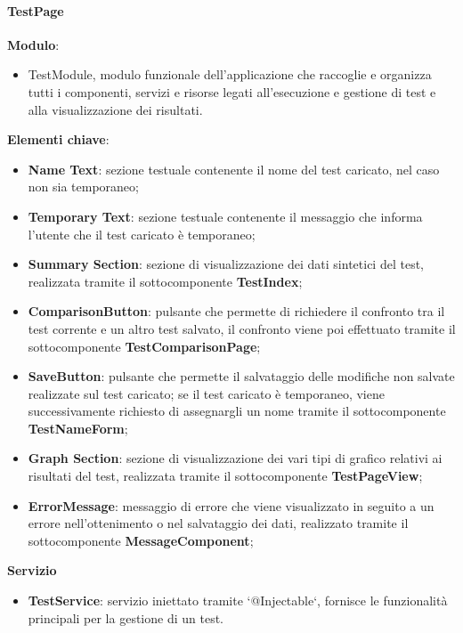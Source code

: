\paragraph{TestPage}
\textbf{Modulo}:
\begin{itemize}
    \item TestModule, modulo funzionale dell'applicazione che raccoglie e organizza tutti i componenti, servizi e risorse legati all'esecuzione e gestione di test e alla visualizzazione dei risultati.    
\end{itemize}
\textbf{Elementi chiave}:
\begin{itemize}
    \item \textbf{Name Text}: sezione testuale contenente il nome del test caricato, nel caso non sia temporaneo;
    \item \textbf{Temporary Text}: sezione testuale contenente il messaggio che informa l'utente che il test caricato è temporaneo;
    \item \textbf{Summary Section}: sezione di visualizzazione dei dati sintetici del test, realizzata tramite il sottocomponente \textbf{TestIndex};
    \item \textbf{ComparisonButton}: pulsante che permette di richiedere il confronto tra il test corrente e un altro test salvato, il confronto viene poi effettuato tramite il sottocomponente \textbf{TestComparisonPage};
    \item \textbf{SaveButton}: pulsante che permette il salvataggio delle modifiche non salvate realizzate sul test caricato; se il test caricato è temporaneo, viene successivamente richiesto di assegnargli un nome tramite il sottocomponente \textbf{TestNameForm};
    \item \textbf{Graph Section}: sezione di visualizzazione dei vari tipi di grafico relativi ai risultati del test, realizzata tramite il sottocomponente \textbf{TestPageView};
    \item \textbf{ErrorMessage}: messaggio di errore che viene visualizzato in seguito a un errore nell'ottenimento o nel salvataggio dei dati, realizzato tramite il sottocomponente \textbf{MessageComponent};
\end{itemize}
\textbf{Servizio}
\begin{itemize}
    \item \textbf{TestService}: servizio iniettato tramite `@Injectable`, fornisce le funzionalità principali per la gestione di un test.
\end{itemize}

